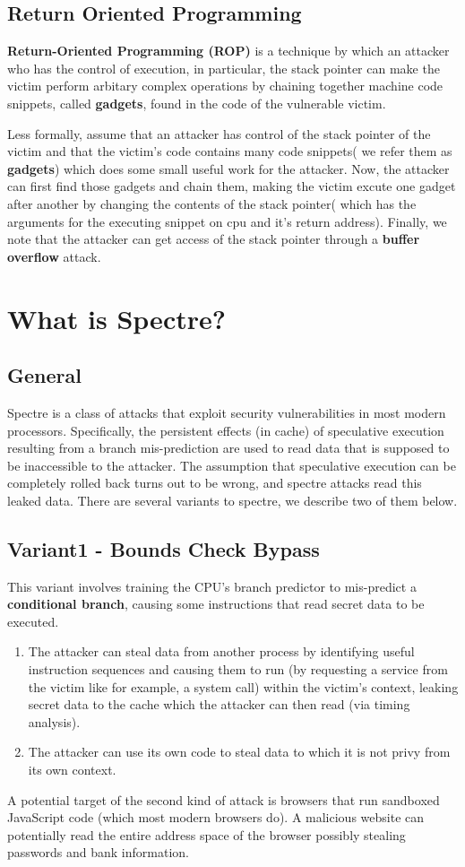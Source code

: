 \documentclass[12pt]{article}
\begin{document}
\subsection{Return Oriented Programming}
\textbf{Return-Oriented Programming (ROP)} is a technique by which an attacker who has the control of execution, in particular, the stack pointer can make the victim perform arbitary complex operations by chaining together machine code snippets, called \textbf{gadgets}, found in the code of the vulnerable victim.

Less formally, assume that an attacker has control of the stack pointer of the victim and that the  victim's code contains many code snippets( we refer them as \textbf{gadgets}) which does some small useful work for the attacker. Now, the attacker can first find those gadgets and chain them, making the victim excute one gadget after another by changing the contents of the stack pointer( which has the arguments for the executing snippet on cpu and it's return address). Finally, we note that the attacker can get access of the stack pointer through a  \textbf{buffer overflow} attack.
\section{What is Spectre?}
\subsection{General}
Spectre is a class of attacks that exploit security vulnerabilities in most modern processors. Specifically, the persistent effects (in cache) of speculative execution resulting from a branch mis-prediction are used to read data that is supposed to be inaccessible to the attacker. The assumption that speculative execution can be completely rolled back turns out to be wrong, and spectre attacks read this leaked data. There are several variants to spectre, we describe two of them below.
\subsection{Variant1 - Bounds Check Bypass}
This variant involves training the CPU's branch predictor to mis-predict a \textbf{conditional branch}, causing some instructions that read secret data to be executed. 
\begin{enumerate}
    \item The attacker can steal data from another process by identifying useful instruction sequences and causing them to run (by requesting a service from the victim like for example, a system call) within the victim's context, leaking secret data to the cache which the attacker can then read (via timing analysis). \item The attacker can use its own code to steal data to which it is not privy from its own context.
\end{enumerate}
 A potential target of the second kind of attack is browsers that run sandboxed JavaScript code (which most modern browsers do). A malicious website can potentially read the entire address space of the browser possibly stealing passwords and bank information.
\end{document}
